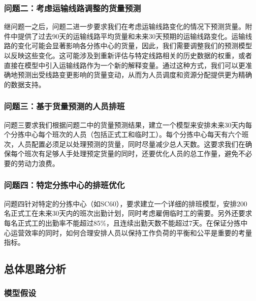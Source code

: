 \documentclass[UTF8]{article}%
\begin{document}
\subsubsection{问题二：考虑运输线路调整的货量预测}
继问题一之后，问题二进一步要求我们在考虑运输线路变化的情况下预测货量。附件中提供了过去90天的运输线路平均货量和未来30天预期的运输线路变化。运输线路的变化可能会显著影响各分拣中心的货量，因此，我们需要调整我们的预测模型以反映这些变化。这可能涉及到重新评估与特定线路相关的历史数据的权重，或者直接在模型中引入运输线路作为一个新的解释变量。通过这种方式，我们可以更准确地预测出受线路变更影响的货量变动，从而为人员调度和资源分配提供更为精确的数据支持。


\subsubsection{问题三：基于货量预测的人员排班}

问题三要求我们根据问题二中的货量预测结果，建立一个模型来安排未来30天内每个分拣中心每个班次的人员（包括正式工和临时工）。每个分拣中心每天有六个班次，人员配置必须足以处理预测的货量，同时尽量减少总人天数。这要求我们在确保每个班次有足够人手处理预定货量的同时，还要优化人员的总工作量，避免不必要的劳动力浪费。

\subsubsection{问题四：特定分拣中心的排班优化}
问题四针对特定的分拣中心（如SC60），要求建立一个详细的排班模型，安排200名正式工在未来30天内的班次出勤计划，同时考虑雇佣临时工的需要。另外还要求每名正式工的出勤率不能超过85\%，且连续出勤天数不能超过7天。在保证分拣中心运营效率的同时，如何合理安排人员以保持工作负荷的平衡和公平是重要的考量指标。

\subsection{总体思路分析}
\subsubsection{模型假设}
\end{document}
